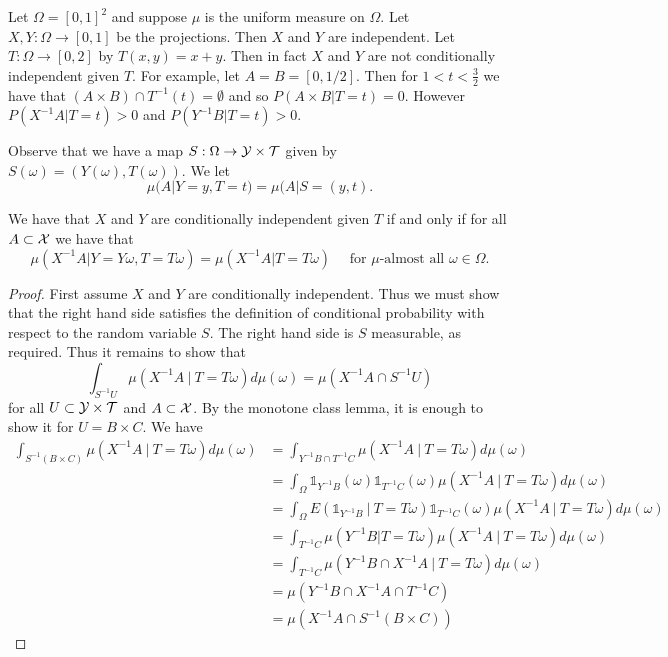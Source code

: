 \documentclass[twoside, a4paper, 10pt]{amsart}
\begin{document}
\begin{eg} Let $\Omega = [0,1]^2$ and suppose $\mu$ is the uniform measure on $\Omega$. Let $X,Y:\Omega \to [0,1]$ be the projections. Then $X$ and $Y$ are independent. Let $T:\Omega \to [0,2]$ by $T(x,y) = x+y$. Then in fact $X$ and $Y$ are not conditionally independent given $T$. For example, let $A=B=[0,1/2]$. Then for $1< t < \frac{3}{2}$  we have that $(A \times B) \cap T^{-1}(t) = \emptyset$ and so $P(A \times B | T=t) = 0$. However $P(X^{-1}A|T=t)>0$ and $P(Y^{-1}B|T=t)>0$.

Observe that we have a map $S:\Omega \to \mathcal{Y} \times \mathcal{T}$ given by $S(\omega)=(Y(\omega), T(\omega))$. We let $$\mu(A|Y=y, T=t) = \mu(A|S=(y,t).$$

\begin{lemma}\label{lemma: conditional independence iff drop conditional} We have that $X$ and $Y$ are conditionally independent given $T$ if and only if for all $A \subset \mathcal{X}$ we have that $$\mu(X^{-1}A | Y=Y\omega, T=T\omega) = \mu(X^{-1}A|T=T\omega) \quad \text{ for $\mu$-almost all } \omega \in \Omega.$$

\end{lemma}

\begin{proof} First assume $X$ and $Y$ are conditionally independent. Thus we must show that the right hand side satisfies the definition of conditional probability with respect to the random variable $S$. The right hand side is $S$ measurable, as required. Thus it remains to show that $$\int_{S^{-1}U}\mu(X^{-1}A ~|~ T=T\omega) d\mu(\omega) = \mu(X^{-1}A \cap S^{-1}U)$$ for all $U \subset \mathcal{Y} \times \mathcal{T}$ and $A \subset \mathcal{X}$. By the monotone class lemma, it is enough to show it for $U = B \times C$. We have 
\begin{align*} \int_{S^{-1}(B \times C)} \mu(X^{-1}A ~|~ T=T\omega) d\mu(\omega) &= \int_{Y^{-1}B \cap T^{-1}C} \mu(X^{-1}A ~|~ T=T\omega) d\mu(\omega) \\
&= \int_{\Omega} \mathds{1}_{Y^{-1}B}(\omega) \mathds{1}_{T^{-1}C}(\omega) \mu(X^{-1}A~|~ T=T\omega) d\mu(\omega) \\
&= \int_{\Omega} E(\mathds{1}_{Y^{-1}B}~|~T=T\omega) \mathds{1}_{T^{-1}C}(\omega) \mu(X^{-1}A ~|~ T=T\omega) d\mu(\omega) \\ 
&=  \int_{T^{-1}C} \mu(Y^{-1}B|T=T\omega) \mu(X^{-1}A ~|~ T=T\omega) d\mu(\omega) \\
&=  \int_{T^{-1}C} \mu(Y^{-1}B \cap X^{-1}A ~|~ T=T\omega)d\mu(\omega) \\
&= \mu(Y^{-1}B \cap X^{-1}A \cap T^{-1}C) \\
&= \mu(X^{-1}A \cap S^{-1}(B \times C)) \end{align*}


\end{proof}
\end{eg}
\end{document}
